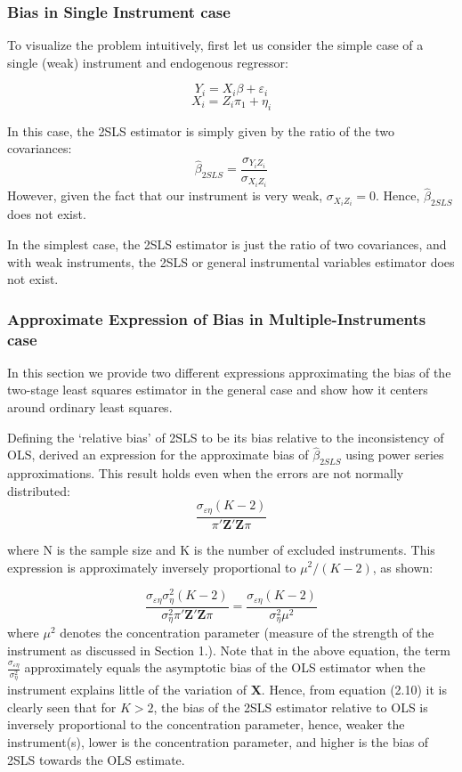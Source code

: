\subsubsection{Bias in Single Instrument case}
To visualize the problem intuitively, first let us consider the simple case of a single (weak) instrument and endogenous regressor:

        $$Y_i = X_i\beta + \varepsilon_i$$
$$X_i = Z_i\pi_1 + \eta_i$$

In this case, the 2SLS estimator is simply given by the ratio of the two covariances: 
\begin{equation}
    \hat\beta_{2SLS}=\frac{\sigma_{Y_iZ_i}}{\sigma_{X_iZ_i}}
\end{equation}
However, given the fact that our instrument is very weak,
$\sigma_{X_iZ_i}=0.$ 
Hence, $\hat\beta_{2SLS}$ does not exist.
\par In the simplest case, the 2SLS estimator is just the ratio of two covariances, and with weak instruments, the 2SLS or general instrumental variables estimator does not exist.
    


\subsubsection{Approximate Expression of Bias in Multiple-Instruments case}
In this section we provide two different expressions approximating the bias of the two-stage least squares estimator in the general case and show how it centers around ordinary least squares. 
\par Defining the `relative bias' of 2SLS to be its bias relative to the
inconsistency of OLS, \cite{buse1992bias} derived an expression for the approximate bias of $\hat\beta_{2SLS}$ using power series approximations. This result holds even when the errors are not normally distributed: 
\begin{equation}
  \frac{\sigma_{\varepsilon\eta }(K-2)}{\pi'\mathbf Z'\mathbf Z\pi}  
\end{equation}

where N is the sample size and K is the number of excluded instruments.
This expression is approximately inversely proportional to $\mu^2/(K-2)$, as shown:

\begin{equation}
\frac{\sigma_{\varepsilon\eta}{\sigma_\eta^2}(K-2)}{{\sigma_\eta^2}\pi'\mathbf Z'\mathbf Z\pi} = \frac{\sigma_{\varepsilon\eta}(K-2)}{{\sigma_\eta^2}{\mu^2}}  
\end{equation}
where $\mu^2$ denotes the concentration parameter (measure of the strength of the instrument as discussed in Section 1.). Note that in the above equation, the term $\frac{\sigma_{\varepsilon\eta }}{\sigma_{\eta }^{2}}$ approximately equals the asymptotic bias of the OLS estimator when the instrument explains little of the variation of $\mathbf X$. Hence, from equation (2.10) it is clearly seen that for $K>2$, the bias of the 2SLS estimator relative to OLS is inversely proportional to the concentration parameter, hence, weaker the instrument(s), lower is the concentration parameter, and higher is the bias of 2SLS towards the OLS estimate.

